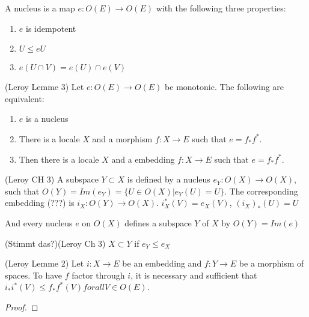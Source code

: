 \begin{definition}[Nucleus]
    \label{def:nucleus}
    \leanok
    A nucleus is a map $e : O(E) \rightarrow O(E)$ with the following three properties:
    \begin{enumerate}
        \item $e$ is idempotent
        \item $U \le e U$
        \item $e(U \cap V) = e(U) \cap e(V)$
    \end{enumerate}
\end{definition}

\begin{lemma}[Nucleus]
(Leroy Lemme 3)
    \label{lem:nucleus}
    Let $e : O(E) \rightarrow O(E)$ be monotonic. The following are equivalent:
    \begin{enumerate}
        \item $e$ is a nucleus
        \item There is a locale $X$ and a morphism $f: X \rightarrow E$ such that $e = f_*f^*$.
        \item Then there is a locale $X$ and a embedding $f: X \rightarrow E$ such that $e = f_*f^*$.
    \end{enumerate}
\end{lemma}

\begin{definition}[Subframe]
(Leroy CH 3)
    \label{def:subframe}
    \leanok
    A subspace $Y \subset X$ is defined by a nucleus $e_Y: O(X) \rightarrow O(X)$, such that $O(Y) = Im(e_Y) = \{U \in O(X) | e_Y(U) = U\}$.
    The corresponding embedding (???) is $i_X : O(Y) \rightarrow O(X)$. $i^*_X(V) = e_X(V)$, $(i_X)_*(U) = U$

    And every nucleus $e$ on $O(X)$ defines a subspace $Y$ of $X$ by $O(Y) = Im(e)$
\end{definition}

\begin{definition}
(Stimmt das?)(Leroy Ch 3)
    \label{def:subframe_inclusion}
    $X \subset Y$ if $e_Y \le e_X$
\end{definition}

\begin{lemma}[factorisation]
(Leroy Lemme 2)
    \label{lem:factorisation}
    \leanok
    Let $i : X \rightarrow E$ be an embedding and $f: Y \rightarrow E$ be a morphism of spaces. To have $f$ factor through $i$, it is necessary and sufficient that $i_*i^*(V) \le f_*f^*(V) for all V \in O(E)$.
\end{lemma}
\begin{proof}
    \leanok
\end{proof}



